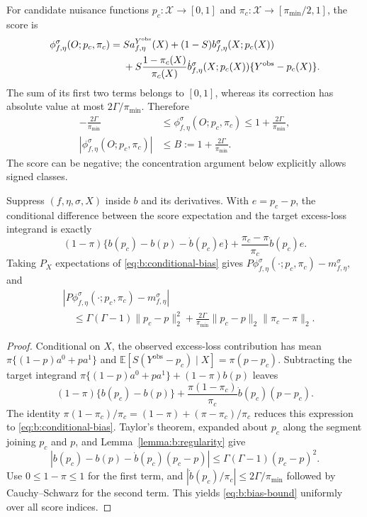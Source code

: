For candidate nuisance functions $p_c:\mathcal X\to[0,1]$ and
$\pi_c:\mathcal X\to[\pi_{\min}/2,1]$, the score is
\begin{align}
 \phi^\sigma_{f,\eta}(O;p_c,\pi_c)
 ={}&S a^{Y^{\mathrm{obs}}}_{f,\eta}(X)
 +(1-S)b^\sigma_{f,\eta}(X;p_c(X)) \notag\\
 &+S\frac{1-\pi_c(X)}{\pi_c(X)}
 \dot b^\sigma_{f,\eta}(X;p_c(X))
 \{Y^{\mathrm{obs}}-p_c(X)\}.
 \label{eq:b:score}
\end{align}
The sum of its first two terms belongs to $[0,1]$, whereas its correction
has absolute value at most $2\Gamma/\pi_{\min}$. Therefore
\begin{equation}
 \begin{split}
 -\frac{2\Gamma}{\pi_{\min}}&\leq
 \phi^\sigma_{f,\eta}(O;p_c,\pi_c)
 \leq1+\frac{2\Gamma}{\pi_{\min}},\\
 |\phi^\sigma_{f,\eta}(O;p_c,\pi_c)|&\leq
 B:=1+\frac{2\Gamma}{\pi_{\min}}.
 \end{split}
 \label{eq:b:score-envelope}
\end{equation}
The score can be negative; the concentration argument below explicitly
allows signed classes.

\begin{lemma}
\label{lemma:b:bias}
Suppress $(f,\eta,\sigma,X)$ inside $b$ and its derivatives. With
$e=p_c-p$, the conditional difference between the score expectation and
the target excess-loss integrand is exactly
\begin{equation}
 (1-\pi)\{b(p_c)-b(p)-\dot b(p_c)e\}
 +\frac{\pi_c-\pi}{\pi_c}\dot b(p_c)e.
 \label{eq:b:conditional-bias}
\end{equation}
Taking $P_X$ expectations of \eqref{eq:b:conditional-bias} gives
$P\phi^\sigma_{f,\eta}(\cdot;p_c,\pi_c)-m^\sigma_{f,\eta}$, and
\begin{equation}
 \begin{aligned}
 &\left|P\phi^\sigma_{f,\eta}(\cdot;p_c,\pi_c)-m^\sigma_{f,\eta}\right|\\
 &\quad\leq\Gamma(\Gamma-1)\|p_c-p\|_2^2
 +\frac{2\Gamma}{\pi_{\min}}\|p_c-p\|_2\|\pi_c-\pi\|_2.
 \end{aligned}
 \label{eq:b:bias-bound}
\end{equation}
\end{lemma}

\begin{proof}
Conditional on $X$, the observed excess-loss contribution has mean
$\pi\{(1-p)a^0+pa^1\}$ and
$\mathbb E[S(Y^{\mathrm{obs}}-p_c)\mid X]=\pi(p-p_c)$.
Subtracting the target integrand
$\pi\{(1-p)a^0+pa^1\}+(1-\pi)b(p)$ leaves
\[
 (1-\pi)\{b(p_c)-b(p)\}
 +\frac{\pi(1-\pi_c)}{\pi_c}\dot b(p_c)(p-p_c).
\]
The identity
$\pi(1-\pi_c)/\pi_c=(1-\pi)+(\pi-\pi_c)/\pi_c$
reduces this expression to \eqref{eq:b:conditional-bias}.
Taylor's theorem, expanded about $p_c$ along the segment joining $p_c$
and $p$, and Lemma~\ref{lemma:b:regularity} give
\[
 |b(p_c)-b(p)-\dot b(p_c)(p_c-p)|
 \leq\Gamma(\Gamma-1)(p_c-p)^2.
\]
Use $0\leq1-\pi\leq1$ for the first term, and
$|\dot b(p_c)/\pi_c|\leq2\Gamma/\pi_{\min}$ followed by
Cauchy--Schwarz for the second term. This yields \eqref{eq:b:bias-bound}
uniformly over all score indices.
\end{proof}

